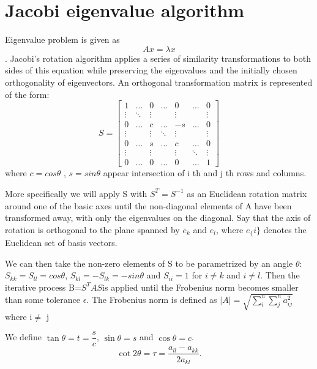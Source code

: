 \documentclass{article}
\begin{document}
\section{Jacobi eigenvalue algorithm}
Eigenvalue problem is given as $$Ax=\lambda x$$ .
Jacobi’s rotation algorithm  applies a series of similarity transformations to both sides of this equation while preserving the eigenvalues and the initially chosen orthogonality of eigenvectors.
An orthogonal transformation matrix is  represented of the form:
\begin{equation}
S = \begin{bmatrix}
1 & \hdots & 0 &\hdots & 0 & \hdots & 0 \\
    \vdots & \ddots & \vdots & {} & \vdots & {} & \vdots \\
    0 & \hdots & c &\hdots & -s & \hdots & 0 \\
    \vdots & {} & \vdots & \ddots & \vdots & {} & \vdots \\
    0 & \hdots & s &\hdots & c & \hdots & 0 \\
    \vdots & {} & \vdots & {} & \vdots & \ddots & \vdots \\
0 & \hdots & 0 &\hdots & 0 & \hdots & 1
\end{bmatrix}
\end{equation}
where $c = cos\theta$ , $s = sin\theta$  appear intersection of i th and j th rows and columns.

 More specifically we will apply S with
$S^{T} =S^{-1} $ as an Euclidean rotation matrix around one of the basic axes until the non-diagonal elements of A have been transformed away, with only the eigenvalues on the diagonal. Say that the axis of rotation is orthogonal to the plane spanned by $e_{k}$ and $e_{l}$, 
where $e_\{{i}\}$ denotes the Euclidean set of basis vectors.

We can then take the non-zero elements of S to be parametrized by an
 angle $\theta$: 
 $S_{kk} = S_{ll} = cos\theta$, $S_{kl} = -S_{lk}= -sin\theta$ 
 and $S_{ii} = 1$ for $i \neq k$ and $i \neq l$.
 Then the iterative process B=$ S^{T}AS $is applied until the Frobenius
norm  becomes smaller than some tolerance $\epsilon$. The Frobenius norm is defined as
$\vert A \vert=\sqrt {\sum_{i}^{n}\sum_{j}^{n} a_{ij}^{2}}$ where i$\neq$ j 

 We define $\tan\theta = t = \dfrac{s}{c}$, $\sin\theta = s$ and $\cos\theta = c$.
\begin{equation*}\cot 2\theta=\tau = \frac{a_{ll}-a_{kk}}{2a_{kl}}.
\end{equation*}
\end{document}
